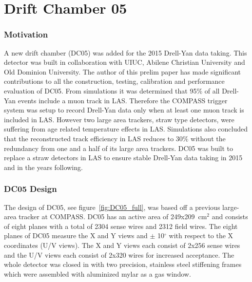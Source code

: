 \chapter{Drift Chamber 05} \label{ch::DC05}
\subsection{Motivation}
A new drift chamber (DC05) was added for the
2015 Drell-Yan data taking.  This detector was built in collaboration
with UIUC, Abilene Christian University and Old Dominion University.
The author of this prelim paper has made significant contributions to
all the construction, testing, calibration and performance evaluation
of DC05.  From simulations it was determined
that 95\% of all Drell-Yan events include a muon track in LAS.
Therefore the COMPASS trigger system was setup to record Drell-Yan
data only when at least one muon track is included in LAS.
However two large area trackers, straw type detectors, were suffering
from age related temperature effects in LAS.  Simulations also
concluded that the reconstructed track efficiency in LAS reduces to
30\% without the redundancy from one and a half of its large area
trackers.  DC05 was built to replace a straw detectors in LAS to
ensure stable Drell-Yan data taking in 2015 and in the years
following.

\subsection{DC05 Design}


The design of DC05, see figure~\ref{fig:DC05_full}, was based off a
previous large-area tracker at COMPASS.  DC05 has an active area of
249x209~cm$^2$ and consists of eight planes with a total of 2304 sense
wires and 2312 field wires.  The eight planes of DC05 measure the X and Y
views and $\pm$ 10$^{\circ}$ with respect to the X coordinates (U/V
views).  The X and Y views each consist of 2x256 sense wires and the
U/V views each consist of 2x320 wires for increased acceptance. The
whole detector was closed in with two precision, stainless steel
stiffening frames which were assembled with aluminized mylar as a gas
window. \par

